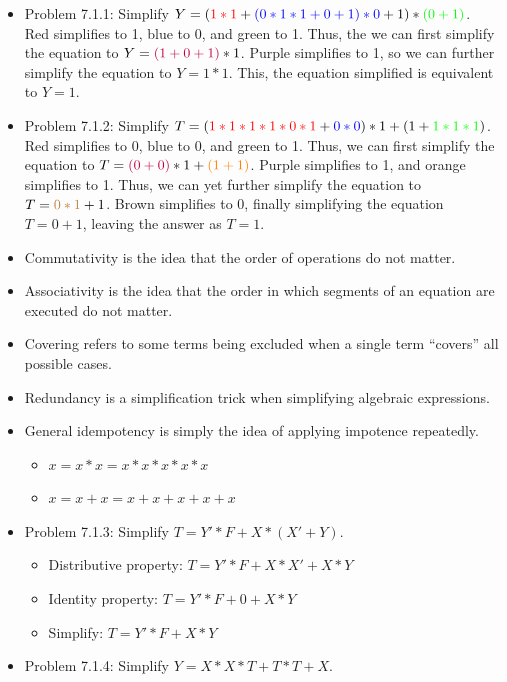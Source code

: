 \documentclass[10pt,a4paper]{article}
\newcommand{\answer}[1]{\boxed{\text{Answer: #1}}}
\begin{document}
\begin{itemize}
\item Problem 7.1.1: Simplify $Y=(\textcolor{red}{1*1}+\textcolor{blue}{(0*1*1+0+1)*0}+1)*\textcolor{green}{(0+1)}$.\\
Red simplifies to 1, blue to 0, and green to 1. Thus, the we can first simplify the equation to $Y=\textcolor{purple}{(1+0+1)}*1$. Purple simplifies to 1, so we can further simplify the equation to $Y=1*1$. This, the equation simplified is equivalent to $Y=1$.\\
\answer{$Y=1$}
\item Problem 7.1.2: Simplify $T=(\textcolor{red}{1*1*1*1*0*1}+\textcolor{blue}{0*0})*1+(1+\textcolor{green}{1*1*1})$.\\
Red simplifies to 0, blue to 0, and green to 1. Thus, we can first simplify the equation to $T=\textcolor{purple}{(0+0)}*1+\textcolor{orange}{(1+1)}$. Purple simplifies to 1, and orange simplifies to 1. Thus, we can yet further simplify the equation to $T=\textcolor{brown}{0*1}+1$. Brown simplifies to 0, finally simplifying the equation $T=0+1$, leaving the answer as $T=1$.\\
\answer{$T=1$}
\item Commutativity is the idea that the order of operations do not matter.
\item Associativity is the idea that the order in which segments of an equation are executed do not matter.
\item Covering refers to some terms being excluded when a single term ``covers'' all possible cases.  
\item Redundancy is a simplification trick when simplifying algebraic expressions. 
\item General idempotency is simply the idea of applying impotence repeatedly.
\begin{itemize}
\item $x=x*x=x*x*x*x*x$
\item $x=x+x=x+x+x+x+x$
\end{itemize}
\item Problem 7.1.3: Simplify $T=Y'*F+X*(X'+Y)$.
\begin{itemize}
\item Distributive property: $T=Y'*F+X*X'+X*Y$
\item Identity property: $T=Y'*F+0+X*Y$
\item Simplify: $T=Y'*F+X*Y$
\end{itemize}
\answer{$T=Y'*F+X*Y$}
\item Problem 7.1.4: Simplify $Y=X*X*T+T*T+X$.
\begin{itemize}

\end{itemize}
\end{itemize}
\end{document}
